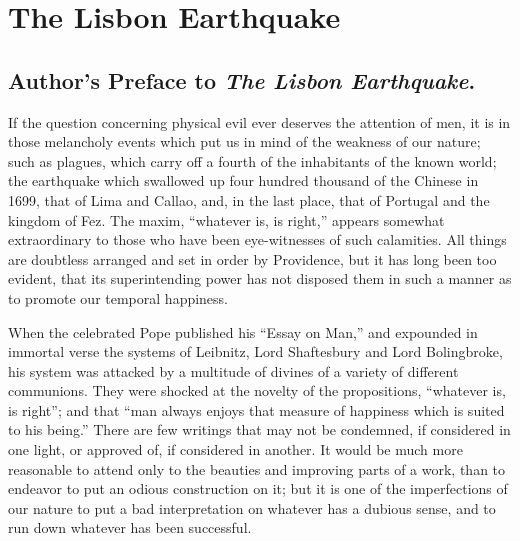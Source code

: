 
\author{Voltaire}
\chapter{The Lisbon Earthquake}

\section{Author's Preface to \emph{The Lisbon Earthquake}.}

If the question concerning physical evil ever deserves the attention
of men, it is in those melancholy events which put us in mind of the
weakness of our nature; such as plagues, which carry off a fourth of
the inhabitants of the known world; the earthquake which swallowed up
four hundred thousand of the Chinese in 1699, that of Lima and Callao,
and, in the last place, that of Portugal and the kingdom of Fez. The
maxim, ``whatever is, is right,'' appears somewhat extraordinary to
those who have been eye-witnesses of such calamities. All things are
doubtless arranged and set in order by Providence, but it has long
been too evident, that its superintending power has not disposed them
in such a manner as to promote our temporal happiness.

When the celebrated Pope published his ``Essay on Man,'' and expounded
in immortal verse the systems of Leibnitz, Lord Shaftesbury and Lord
Bolingbroke, his system was attacked by a multitude of divines of a
variety of different communions. They were shocked at the novelty of
the propositions, ``whatever is, is right''; and that ``man always
enjoys that measure of happiness which is suited to his being.'' There
are few writings that may not be condemned, if considered in one
light, or approved of, if considered in another. It would be much more
reasonable to attend only to the beauties and improving parts of a
work, than to endeavor to put an odious construction on it; but it is
one of the imperfections of our nature to put a bad interpretation on
whatever has a dubious sense, and to run down whatever has been
successful.

